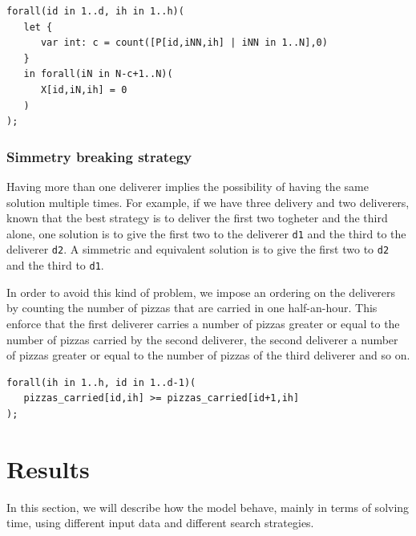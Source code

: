 \documentclass[10pt]{article}
\begin{document}
\begin{enumerate}
		\begin{verbatim}
forall(id in 1..d, ih in 1..h)(
   let {
      var int: c = count([P[id,iNN,ih] | iNN in 1..N],0)
   }
   in forall(iN in N-c+1..N)(
      X[id,iN,ih] = 0
   )  
);
		\end{verbatim}
		

	\end{enumerate}

	\subsubsection{Simmetry breaking strategy}
	Having more than one deliverer implies the possibility of having the same solution 
	multiple times. For example, if we have three delivery and two deliverers, known that
	the best strategy is to deliver the first two togheter and the third alone, one solution is 
	to give the first two to the deliverer \texttt{d1} and the third to the deliverer \texttt{d2}.
	A simmetric and equivalent solution is to give the first two to \texttt{d2} and 
	the third to \texttt{d1}.

	In order to avoid this kind of problem, we impose an ordering on the deliverers by 
	counting the number of pizzas that are carried in one half-an-hour. This enforce that 
	the first deliverer carries a number of pizzas greater or equal to the number of
	pizzas carried by the second deliverer, the second deliverer a number of pizzas greater or 
	equal to the number of pizzas of the third deliverer and so on.
\begin{verbatim}
forall(ih in 1..h, id in 1..d-1)(
   pizzas_carried[id,ih] >= pizzas_carried[id+1,ih]
);
\end{verbatim}

%
%
	\section{Results}
	\label{Results}

	In this section, we will describe how the model behave, mainly in terms of solving
	time, using different input data and different search strategies.
\end{document}
